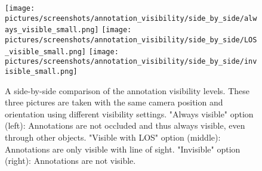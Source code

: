 \begin{figure}%
	\texttt{[image: pictures/screenshots/annotation\_visibility/side\_by\_side/always\_visible\_small.png]}
	\texttt{[image: pictures/screenshots/annotation\_visibility/side\_by\_side/LOS\_visible\_small.png]}
	\texttt{[image: pictures/screenshots/annotation\_visibility/side\_by\_side/invisible\_small.png]}
	\caption[Annotation visibility levels comparison]{A side-by-side comparison of the annotation visibility levels. These three pictures are taken with the same camera position
	and orientation using different visibility settings. 	
	"Always visible" option (left): Annotations are not occluded and thus always visible, even through other objects. %
	"Visible with LOS" option (middle): Annotations are only visible with line of sight. 	
	"Invisible" option (right): Annotations are not visible.}
	\label{fig:visibility_comparison}
\end{figure} 